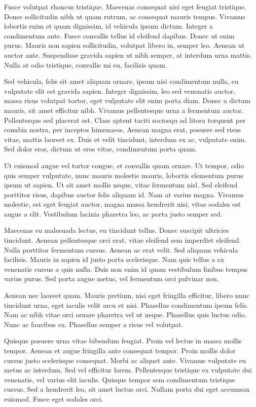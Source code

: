 \documentclass[12pt, letterpaper,twocolumn]{article}
\begin{document}
Fusce volutpat rhoncus tristique. Maecenas consequat nisi eget feugiat tristique. Donec sollicitudin nibh ut quam rutrum, ac consequat mauris tempus. Vivamus lobortis enim et quam dignissim, id vehicula ipsum dictum. Integer a condimentum ante. Fusce convallis tellus id eleifend dapibus. Donec ut enim purus. Mauris non sapien sollicitudin, volutpat libero in, semper leo. Aenean ut auctor ante. Suspendisse gravida sapien ut nibh semper, at interdum urna mattis. Nulla at odio tristique, convallis mi eu, facilisis quam.

Sed vehicula, felis sit amet aliquam ornare, ipsum nisi condimentum nulla, eu vulputate elit est gravida sapien. Integer dignissim, leo sed venenatis auctor, massa risus volutpat tortor, eget vulputate elit enim porta diam. Donec a dictum mauris, sit amet efficitur nibh. Vivamus pellentesque urna a fermentum auctor. Pellentesque sed placerat est. Class aptent taciti sociosqu ad litora torquent per conubia nostra, per inceptos himenaeos. Aenean magna erat, posuere sed risus vitae, mattis laoreet ex. Duis et velit tincidunt, interdum ex ac, vulputate enim. Sed dolor eros, dictum ut eros vitae, condimentum porta quam.

Ut euismod augue vel tortor congue, et convallis quam ornare. Ut tempor, odio quis semper vulputate, nunc mauris molestie mauris, lobortis elementum purus ipsum ut sapien. Ut sit amet mollis neque, vitae fermentum nisl. Sed eleifend porttitor risus, dapibus auctor felis aliquam id. Nam at varius magna. Vivamus molestie, est eget feugiat auctor, magna massa hendrerit nisi, vitae sodales est augue a elit. Vestibulum lacinia pharetra leo, ac porta justo semper sed.

Maecenas eu malesuada lectus, eu tincidunt tellus. Donec suscipit ultricies tincidunt. Aenean pellentesque orci erat, vitae eleifend sem imperdiet eleifend. Nulla porttitor fermentum cursus. Aenean ac erat velit. Sed aliquam vehicula facilisis. Mauris in sapien id justo porta scelerisque. Nam quis tellus a ex venenatis cursus a quis nulla. Duis non enim id quam vestibulum finibus tempus varius purus. Sed porta augue metus, vel fermentum orci pulvinar non.

Aenean nec laoreet quam. Mauris pretium, nisi eget fringilla efficitur, libero nunc tincidunt urna, eget iaculis velit arcu et nisi. Phasellus condimentum ipsum felis. Nam ac nibh vitae orci ornare pharetra vel ut neque. Phasellus quis luctus odio. Nunc ac faucibus ex. Phasellus semper a risus vel volutpat.

Quisque posuere urna vitae bibendum feugiat. Proin vel lectus in massa mollis tempor. Aenean et augue fringilla ante consequat tempor. Proin mollis dolor cursus justo scelerisque consequat. Morbi ac aliquet ante. Vivamus vulputate eu metus ac interdum. Sed vel efficitur lorem. Pellentesque tristique ex vulputate dui venenatis, vel varius elit iaculis. Quisque tempor sem condimentum tristique cursus. Sed a hendrerit leo, sit amet luctus orci. Nullam porta dui eget accumsan euismod. Fusce eget sodales orci.
\end{document}
